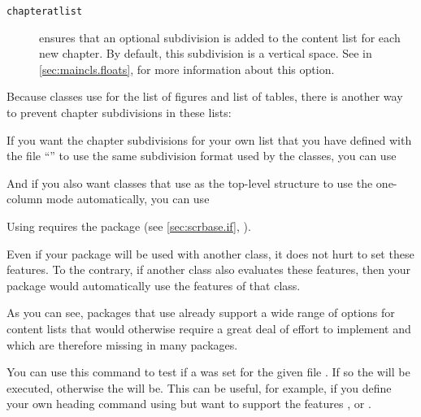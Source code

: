 \begin{description}
\item[\texttt{chapteratlist}] ensures that an optional subdivision is added
  to the content list for each new chapter. By default, this subdivision is a
  vertical space. See %
   in
  \autoref{sec:maincls.floats},  for more
  information about this option.
\end{description}
\begin{Example}
  Because \KOMAScript{} classes use  for the list of figures
  and list of tables, there is another way to prevent chapter subdivisions in
  these lists:
\begin{lstcode}
\end{lstcode}

  If you want the chapter subdivisions for your own list that you have defined
  with the file  ``'' to use the same subdivision
  format used by the \KOMAScript{} classes, you can use
\begin{lstcode}
\end{lstcode}
  And if you also want classes that use  as the
  top-level structure to use the one-column mode automatically, you can
  use
\begin{lstcode}
\end{lstcode}
  Using  requires the
   package (see \autoref{sec:scrbase.if},
  ).

  Even if your package will be used with another class, it
  does not hurt to set these features. To the contrary, if another class also
  evaluates these features, then your package would automatically use the
  features of that class.
\end{Example}
As you can see, packages that use  already support a wide
range of options for content lists that would otherwise require a great deal
of effort to implement and which are therefore missing in many packages.%
\EndIndexGroup


\begin{Declaration}
\end{Declaration}
You can use this command to test if a  was set for the given
file . If so the  will be executed,
otherwise the  will be. This can be useful, for example, if
you define your own heading command using
 but want to support the features
,  or .%
\EndIndexGroup


